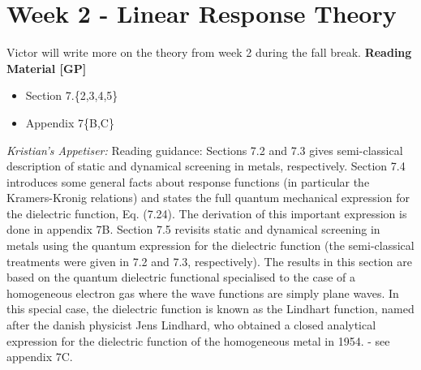 \section*{Week 2 - Linear Response Theory}\label{sec:week2}
Victor will write more on the theory from week 2 during the fall break.
\textbf{Reading Material [GP]}
\begin{itemize}
    \item Section 7.\{2,3,4,5\} 
    \item Appendix 7\{B,C\}
\end{itemize}

\emph{Kristian's Appetiser:} Reading guidance: Sections 7.2 and 7.3 gives semi-classical description of static and dynamical screening in metals, respectively. Section 7.4 introduces some general facts about response functions (in particular the Kramers-Kronig relations) and states the full quantum mechanical expression for the dielectric function, Eq. (7.24). The derivation of this important expression is done in appendix 7B. Section 7.5 revisits static and dynamical screening in metals using the quantum expression for the dielectric function (the semi-classical treatments were given in 7.2 and 7.3, respectively). The results in this section are based on the quantum dielectric functional specialised to the case of a homogeneous electron gas where the wave functions are simply plane waves. In this special case, the dielectric function is known as the Lindhart function, named after the danish physicist Jens Lindhard, who obtained a closed analytical expression for the dielectric function of the homogeneous metal in 1954. - see appendix 7C. 